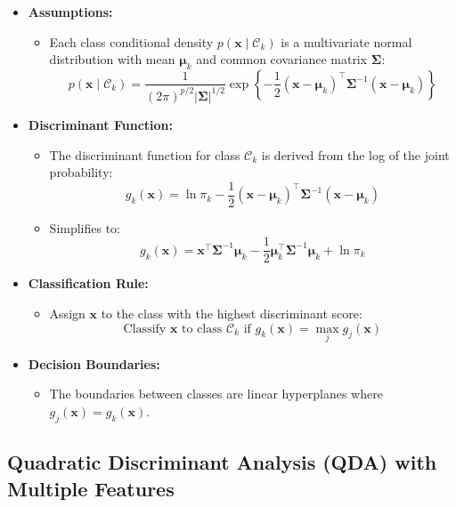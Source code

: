 \documentclass{article}
\begin{document}
\begin{itemize}
    \item \textbf{Assumptions:}
    \begin{itemize}
        \item Each class conditional density $p(\mathbf{x} \mid \mathcal{C}_k)$ is a multivariate normal distribution with mean $\boldsymbol{\mu}_k$ and common covariance matrix $\boldsymbol{\Sigma}$:
        \[
        p(\mathbf{x} \mid \mathcal{C}_k) = \frac{1}{(2\pi)^{p/2} |\boldsymbol{\Sigma}|^{1/2}} \exp\left\{ -\frac{1}{2} (\mathbf{x} - \boldsymbol{\mu}_k)^\top \boldsymbol{\Sigma}^{-1} (\mathbf{x} - \boldsymbol{\mu}_k) \right\}
        \]
    \end{itemize}
    \item \textbf{Discriminant Function:}
    \begin{itemize}
        \item The discriminant function for class $\mathcal{C}_k$ is derived from the log of the joint probability:
        \[
        g_k(\mathbf{x}) = \ln \pi_k - \frac{1}{2} (\mathbf{x} - \boldsymbol{\mu}_k)^\top \boldsymbol{\Sigma}^{-1} (\mathbf{x} - \boldsymbol{\mu}_k)
        \]
        \item Simplifies to:
        \[
        g_k(\mathbf{x}) = \mathbf{x}^\top \boldsymbol{\Sigma}^{-1} \boldsymbol{\mu}_k - \frac{1}{2} \boldsymbol{\mu}_k^\top \boldsymbol{\Sigma}^{-1} \boldsymbol{\mu}_k + \ln \pi_k
        \]
    \end{itemize}
    \item \textbf{Classification Rule:}
    \begin{itemize}
        \item Assign $\mathbf{x}$ to the class with the highest discriminant score:
        \[
        \text{Classify } \mathbf{x} \text{ to class } \mathcal{C}_k \text{ if } g_k(\mathbf{x}) = \max_j g_j(\mathbf{x})
        \]
    \end{itemize}
    \item \textbf{Decision Boundaries:}
    \begin{itemize}
        \item The boundaries between classes are linear hyperplanes where $g_j(\mathbf{x}) = g_k(\mathbf{x})$.
    \end{itemize}
\end{itemize}

\subsection{Quadratic Discriminant Analysis (QDA) with Multiple Features}
\end{document}
